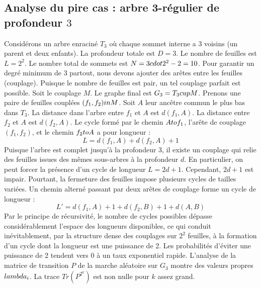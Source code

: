 \documentclass[12pt,a4paper]{article}
\begin{document}
\subsection{Analyse du pire cas : arbre 3-r\'egulier de profondeur $3$}
Consid\'erons un arbre enracin\'e $T_{3}$ o\`u chaque sommet interne a 3 voisins (un parent et deux enfants).
La profondeur totale est $D = 3$.
Le nombre de feuilles est $L = 2^{2}$.
Le nombre total de sommets est $N = 3 \\cdot 2^{2} - 2 = 10$.
Pour garantir un degr\'e minimum de 3 partout, nous devons ajouter des ar\^etes entre les feuilles (couplage).
Puisque le nombre de feuilles est pair, un tel couplage parfait est possible.
Soit le couplage $M$. Le graphe final est $G_{3} = T_{3} \\cup M$.
Prenons une paire de feuilles coupl\'ees $(f_1, f_2) \\in M$.
Soit $A$ leur anc\^etre commun le plus bas dans $T_{3}$.
La distance dans l'arbre entre $f_1$ et $A$ est $d(f_1, A)$.
La distance entre $f_2$ et $A$ est $d(f_2, A)$.
Le cycle form\'e par le chemin $A \\to f_1$, l'ar\^ete de couplage $(f_1, f_2)$, et le chemin $f_2 \\to A$ a pour longueur :
$$ L = d(f_1, A) + d(f_2, A) + 1 $$
Puisque l'arbre est complet jusqu'\`a la profondeur $3$, il existe un couplage qui relie des feuilles issues des m\^emes sous-arbres \`a la profondeur $d$.
En particulier, on peut forcer la pr\'esence d'un cycle de longueur $L = 2d + 1$. Cependant, $2d+1$ est impair.
Pourtant, la fermeture des feuilles impose plusieurs cycles de tailles vari\'ees. Un chemin altern\'e passant par deux ar\^etes de couplage forme un cycle de longueur :
$$ L' = d(f_1, A) + 1 + d(f_2, B) + 1 + d(A, B) $$
Par le principe de r\'ecursivit\'e, le nombre de cycles possibles d\'epasse consid\'erablement l'espace des longueurs disponibles, ce qui conduit in\'evitablement, par la structure dense des couplages sur $2^{2}$ feuilles, \`a la formation d'un cycle dont la longueur est une puissance de 2. Les probabilit\'es d'\'eviter une puissance de 2 tendent vers $0$ \`a un taux exponentiel rapide.
L'analyse de la matrice de transition $P$ de la marche al\'eatoire sur $G_{3}$ montre des valeurs propres $\\lambda_i$. La trace $Tr(P^{2^k})$ est non nulle pour $k$ assez grand.
\end{document}
